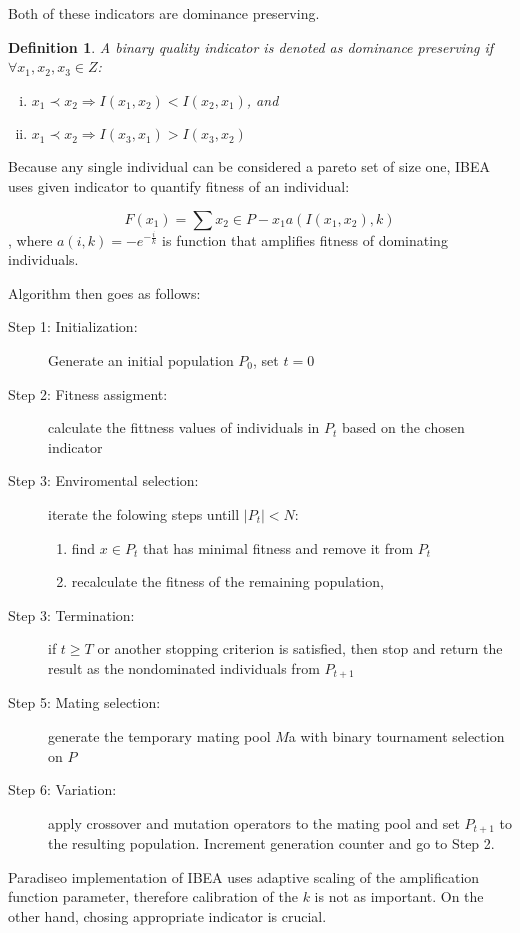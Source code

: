 \documentclass[12pt,oneside]{fithesis2}
\newtheorem{defn}{Definition}
\begin{document}
Both of these indicators are dominance preserving. 

\begin{defn}
A binary quality indicator is denoted as dominance preserving if $\forall x_1,x_2,x_3 \in Z$:
\begin{enumerate}[(i)]
\item  $x_1 \prec x_2 \Rightarrow I({x_1},{x_2}) < I({x_2},{x_1})$, and
\item $x_1 \prec x_2 \Rightarrow I({x_3},{x_1}) > I({x_3},{x_2})$
\end{enumerate}
\end{defn}
Because any single individual can be considered a pareto set of size one, IBEA uses given indicator to quantify fitness of an individual:

$$F(x_1) = \sum\limits{x_2 \in P - {x_1}} a(I(x_1,x_2),k)$$,
    where $a(i,k) = -e^{-\frac{i}{k}}$ is function that amplifies fitness of dominating individuals.

Algorithm then goes as follows:
\begin{description}
	\item[Step 1: Initialization:] Generate an initial population $P_0$, set $t=0$
	\item[Step 2: Fitness assigment:] calculate the fittness values of individuals in $P_t$ based on the chosen indicator
	\item[Step 3: Enviromental selection:] iterate the folowing steps untill $|P_t|< N$: 
       \begin{enumerate}
        \item find $x \in P_t$ that has minimal fitness and remove it from $P_t$
        \item recalculate the fitness of the remaining population, 
       \end{enumerate}
	\item[Step 3: Termination:] if $t \geq T$ or another stopping criterion is satisfied, then stop and return the result as the nondominated individuals from $P_{t+1}$
	\item[Step 5: Mating selection:] generate the temporary mating pool $M$a with binary tournament selection on $P$
	\item[Step 6: Variation:] apply crossover and mutation operators to the mating pool and set $P_{t+1}$ to the resulting population. Increment generation counter and go to Step 2.
\end{description}

Paradiseo implementation of IBEA uses adaptive scaling of the amplification function parameter, therefore calibration of the $k$ is not as important. On the other hand, chosing appropriate indicator is crucial.
\end{document}

